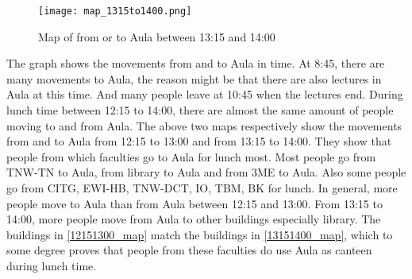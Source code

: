 \begin{figure}[H]
	\centering
	\texttt{[image: map\_1315to1400.png]}
	\captionsetup{justification=centering}
	\caption{Map of from or to Aula between 13:15 and 14:00}
	\label{13151400_map}
\end{figure}
The graph shows the movements from and to Aula in time. At 8:45, there are many movements to Aula, the reason might be that there are also lectures in Aula at this time. And many people leave at 10:45 when the lectures end. During lunch time between 12:15 to 14:00, there are almost the same amount of people moving to and from Aula.
The above two maps respectively show the movements from and to Aula from 12:15 to 13:00 and from 13:15 to 14:00. They show that people from which faculties go to Aula for lunch most.
Most people go from TNW-TN to Aula, from library to Aula and from 3ME to Aula. Also some people go from CITG, EWI-HB, TNW-DCT, IO, TBM, BK for lunch. In general, more people move to Aula than from Aula between 12:15 and 13:00. From 13:15 to 14:00, more people move from Aula to other buildings especially library. The buildings in \autoref{12151300_map} match the buildings in \autoref{13151400_map}, which to some degree proves that people from these faculties do use Aula as canteen during lunch time.